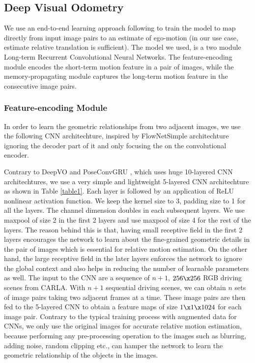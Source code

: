 \documentclass[letterpaper, 12pt]{book}
\theoremstyle{definition}
\theoremstyle{definition}
\theoremstyle{definition}
\theoremstyle{definition}
\theoremstyle{definition}
\begin{document}
\subsection{Deep Visual Odometry}
\label{sec:org806900a}
We use an end-to-end learning approach following \cite{Wang2017, Zhai2019} to
train the model to map directly from input image pairs to an estimate of
ego-motion (in our use case, estimate relative translation is sufficient). The
model we used, is a two module Long-term Recurrent Convolutional Neural
Networks. The feature-encoding module encodes the short-term motion feature in a
pair of images, while the memory-propagating module captures the long-term
motion feature in the consecutive image pairs.

\subsubsection{Feature-encoding Module}
\label{sec:orgead10f9}
In order to learn the geometric relationships from
two adjacent images, we use the following CNN architechture, inspired by
FlowNetSimple architechture \cite{Fischer2015} ignoring the decoder part of it
and only focusing the on the convolutional encoder.

Contrary to DeepVO \cite{Wang2017} and PoseConvGRU \cite{Zhai2019}, which uses
huge 10-layered CNN architechtures, we use a very simple and lightweight
5-layered CNN architechture as shown in Table \ref{table1}. Each layer is
followed by an application of ReLU nonlinear activation function. We keep the
kernel size to 3, padding size to 1 for all the layers. The channel dimension
doubles in each subsequent layers. We use maxpool of size 2 in the first 2
layers and use maxpool of size 4 for the rest of the layers. The reason behind
this is that, having small receptive field in the first 2 layers encourages the
network to learn about the fine-grained geometric details in the pair of images
which is essential for relative motion estimation. On the other hand, the large
receptive field in the later layers enforces the network to ignore the global
context and also helps in reducing the number of learnable parameters as
well. The input to the CNN are a sequence of \(n+1\), \(256 \x 256\) RGB driving
scenes from CARLA. With \(n+1\) sequential driving scenes, we can obtain \(n\)
sets of image pairs taking two adjacent frames at a time. These image pairs are
then fed to the 5-layered CNN to obtain a feature maps of size \(1 \x 1 \x
1024\) for each image pair. Contrary to the typical training process with
augmented data for CNNs, we only use the original images for accurate relative
motion estimation, because performing any pre-processing operation to the images
such as blurring, adding noise, random clipping etc., can hamper the network to
learn the geometric relationship of the objects in the images.
\end{document}
